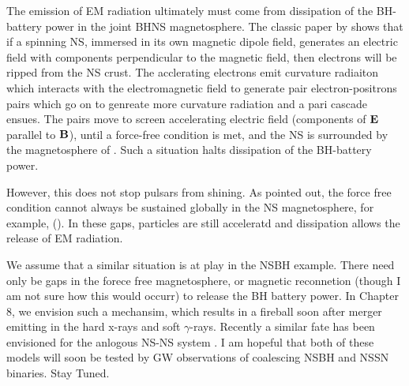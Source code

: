 The emission of EM radiation ultimately must come from dissipation of the BH-
battery power in the joint BHNS magnetosphere. The classic paper by
\cite{GJ:1969} shows that if a spinning NS, immersed in its own magnetic dipole
field, generates an electric field with components perpendicular to the
magnetic field, then electrons will be ripped from the NS crust. The
acclerating electrons emit curvature radiaiton which interacts with the
electromagnetic field to generate pair electron-positrons pairs which go on to
genreate more curvature radiation and a pari cascade ensues. The pairs move to
screen accelerating electric field (components of ${\bf E}$ parallel to
${\bf B}$), until a force-free condition is met, and the NS is surrounded by the
magnetosphere of \citep{GJ:1969}. Such a situation halts dissipation of the BH-battery power. 

However, this does not stop pulsars from shining.  As \citep{RudSuth:1975} pointed out, the force free condition cannot always be sustained globally in the NS magnetosphere, for example, (). In these gaps, particles are still acceleratd and dissipation allows the release of EM radiation.

We assume that a similar situation is at play in the NSBH example. There need only be gaps in the forece free magnetosphere, or magnetic reconnetion (though I am not sure how this would occurr) to release the BH battery power. In Chapter 8, we envision such a mechansim, which results in a fireball soon after merger emitting in the hard x-rays and soft $\gamma$-rays. Recently a similar fate has been envisioned for the anlogous NS-NS system \citep{MetzgerNSNS:2016}. I am hopeful that both of these models will soon be tested by GW observations of coalescing NSBH and NSSN binaries. Stay Tuned.












